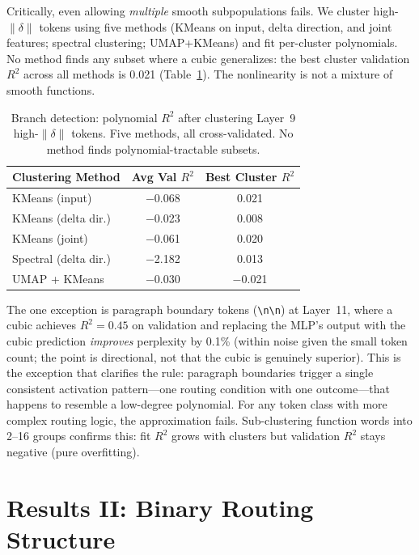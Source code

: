 \documentclass{article}
\begin{document}
Critically, even allowing \emph{multiple} smooth subpopulations fails. We cluster
high-$\|\delta\|$ tokens using five methods (KMeans on input, delta direction, and joint
features; spectral clustering; UMAP+KMeans) and fit per-cluster polynomials. No method finds
any subset where a cubic generalizes: the best cluster validation $R^2$ across all methods is
0.021 (Table~\ref{tab:branches}). The nonlinearity is not a mixture of smooth functions.

\begin{table}[t]
\caption{Branch detection: polynomial $R^2$ after clustering Layer~9 high-$\|\delta\|$ tokens.
  Five methods, all cross-validated. No method finds polynomial-tractable subsets.}
\label{tab:branches}
\centering
\begin{tabular}{lcc}
\toprule
Clustering Method & Avg Val $R^2$ & Best Cluster $R^2$ \\
\midrule
KMeans (input)       & $-$0.068 & 0.021 \\
KMeans (delta dir.)  & $-$0.023 & 0.008 \\
KMeans (joint)       & $-$0.061 & 0.020 \\
Spectral (delta dir.) & $-$2.182 & 0.013 \\
UMAP + KMeans        & $-$0.030 & $-$0.021 \\
\bottomrule
\end{tabular}
\end{table}

The one exception is paragraph boundary tokens (\texttt{\textbackslash n\textbackslash n}) at
Layer~11, where a cubic achieves $R^2 = 0.45$ on validation and replacing the MLP's output with
the cubic prediction \emph{improves} perplexity by 0.1\% (within noise given the small
token count; the point is directional, not that the cubic is genuinely superior). This is the exception that clarifies
the rule: paragraph boundaries trigger a single consistent activation pattern---one routing
condition with one outcome---that happens to resemble a low-degree polynomial. For any token
class with more complex routing logic, the approximation fails. Sub-clustering function words
into 2--16 groups confirms this: fit $R^2$ grows with clusters but validation $R^2$ stays
negative (pure overfitting).

\section{Results II: Binary Routing Structure}
\label{sec:boolean}
\end{document}
